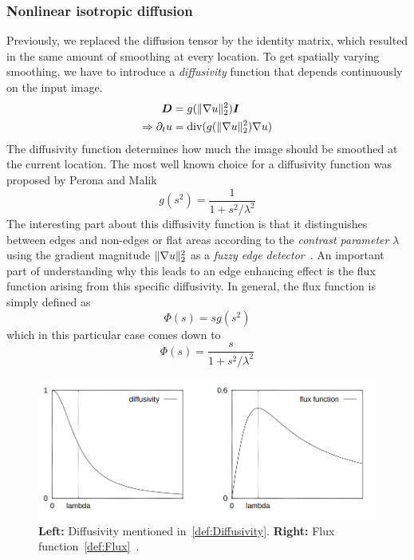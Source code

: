 \subsubsection*{Nonlinear isotropic diffusion}\label{sub:NonIsoDiff}
Previously, we replaced the diffusion tensor by the identity matrix, which resulted in the same
amount of smoothing at every location.
To get spatially varying smoothing, we have to introduce a \textit{diffusivity} function that
depends continuously on the input image. 
\begin{align}
    \boldsymbol D &= g(\lVert\mathbf{\nabla} u\rVert_2^2)\boldsymbol I\\
    \Rightarrow \partial_t u & = \textnormal{div}(g(\lVert\mathbf{\nabla}
    u\rVert_2^2)\mathbf{\nabla} u)\label{eq:NonIsoDiff}
\end{align}
The diffusivity function determines how much the image should be smoothed at the current location.
The most well known choice for a diffusivity function was proposed by Perona and Malik 
~\cite{perona-malik}
\begin{equation}
    g(s^2) = \frac{1}{1 + s^2/\lambda^2}\label{def:Diffusivity}
\end{equation}
The interesting part about this diffusivity function is that it distinguishes between edges and
non-edges or flat areas according to the \textit{contrast parameter} $\lambda$ using the gradient
magnitude $\lVert\mathbf{\nabla} u\rVert_2^2$ as a \textit{fuzzy edge detector}~\cite{dic}. An important part
of understanding why this leads to an edge enhancing effect is the flux function
arising from this specific diffusivity. In general, the flux function is simply defined as 
\begin{equation}
    \Phi(s) = sg(s^2)
\end{equation}
which in this particular case comes down to
\begin{equation}
    \Phi(s) =\frac{s}{1 + s^2/\lambda^2}\label{def:Flux}
\end{equation}
\begin{figure}
    \includegraphics[width=\linewidth]{../Images/diffflux.png}
    \caption{\textbf{Left:} Diffusivity mentioned in~\eqref{def:Diffusivity}. \textbf{Right:} Flux
    function~\eqref{def:Flux}~\cite{dic}.}\label{fig:DiffFlux}
\end{figure}
